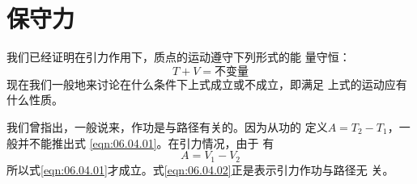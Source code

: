 \section{保守力}\label{sec:06.04}

我们已经证明在引力作用下，质点的运动遵守下列形式的能
量守恒：
\begin{equation}\label{eqn:06.04.01}
    T + V =  \text{不变量}
\end{equation}
现在我们一般地来讨论在什么条件下上式成立或不成立，即满足
上式的运动应有什么性质。

我们曾指出，一般说来，作功是与路径有关的。因为从功的
定义$  A = T _ { 2 } - T _ { 1 }   $，一般并不能推出式 \eqref{eqn:06.04.01}。在引力情况，由于
有
\begin{equation}\label{eqn:06.04.02}
    A = V _ { 1 } - V _ { 2 }
\end{equation}
所以式\eqref{eqn:06.04.01}才成立。式\eqref{eqn:06.04.02}正是表示引力作功与路径无
关。

